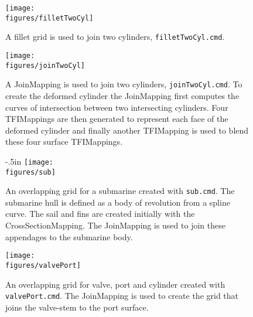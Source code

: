 \documentclass[xcolor=rgb,svgnames,dvipsnames]{article}
\newcommand{\figures}{../fig}
\begin{document}
\newcommand{\figHeight}{3.75in}
\newcommand{\figWidths}{12cm}

\begin{figure}[htb]
  \begin{center}
   \texttt{[image: \\figures/filletTwoCyl]}
  \caption{A fillet grid is used to join two cylinders, {\tt filletTwoCyl.cmd}.}
  \end{center}
\end{figure}

\begin{figure}[hbt]
  \begin{center}
   \texttt{[image: \\figures/joinTwoCyl]}
  \caption{A JoinMapping is used to join two cylinders, {\tt joinTwoCyl.cmd}. To create the deformed
     cylinder the JoinMapping first computes the curves of intersection between two intersecting
      cylinders. Four TFIMappings are then generated to represent each face of the deformed cylinder
       and finally another TFIMapping is used to blend these four surface TFIMappings. }
  \end{center}
\end{figure}

\begin{figure}[hbt]
  \begin{center}
   \vglue-.5in
   \texttt{[image: \\figures/sub]}
  \caption{An overlapping grid for a submarine created with {\tt sub.cmd}. The submarine hull is
   defined as a body of revolution from a spline curve. The sail and fins are
     created initially with the CrossSectionMapping. The JoinMapping is used to join these appendages
     to the submarine body.}
  \end{center}
\end{figure}

\begin{figure}[hbt]
  \begin{center}
   \texttt{[image: \\figures/valvePort]}
  \caption{An overlapping grid for valve, port and cylinder created with {\tt valvePort.cmd}. 
    The JoinMapping is used to create the
    grid that joins the valve-stem to the port surface.}
  \end{center}
\end{figure}
\end{document}
